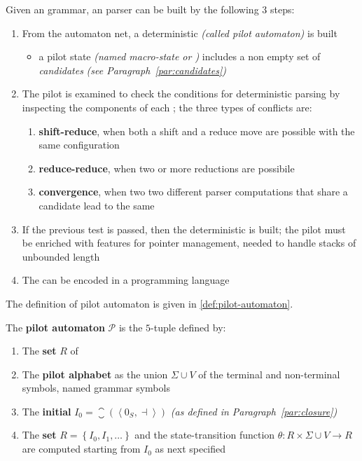 \documentclass[english]{article}
\begin{document}
Given an \EBNF grammar, an \elro parser can be built by the following \(3\) steps:

\begin{enumerate}
  \item From the automaton net, a deterministic \FSA \textit{(called pilot automaton)} is built
        \begin{itemize}
          \item a pilot state \textit{(named macro-state or \mstate)} includes a non empty set of \textit{candidates} \textit{(see Paragraph~\ref{par:candidates})}
        \end{itemize}
  \item The pilot is examined to check the conditions for deterministic parsing by inspecting the components of each \mstate; the three types of conflicts are:
        \begin{enumerate}[label=\Alph*.]
          \item \textbf{shift-reduce}, when both a shift and a reduce move are possible with the same configuration
          \item \textbf{reduce-reduce}, when two or more reductions are possibile
          \item \textbf{convergence}, when two two different parser computations that share a candidate lead to the same \mstate
        \end{enumerate}
  \item If the previous test is passed, then the deterministic \PDA is built; the pilot \FSA must be enriched with features for pointer management, needed to handle stacks of unbounded length
  \item The \PDA can be encoded in a programming language
\end{enumerate}

The definition of pilot automaton is given in \ref{def:pilot-automaton}.

\begin{definition}
  \label{def:pilot-automaton}
  The \textbf{pilot automaton} \(\mathcal{P}\) is the \(5\)-tuple defined by:

  \begin{enumerate}
    \item The \textbf{set} \(R\) of \mstates
    \item The \textbf{pilot alphabet} as the union \(\Sigma \cup V\) of the terminal and non-terminal symbols, named grammar symbols
    \item The \textbf{initial \mstate} \(I_0 = \closure\left( \left\langle 0_S, \dashv \right\rangle \right)\) \textit{(as defined in Paragraph~\ref{par:closure})}
    \item The \textbf{\mstate set} \(R = \left\{ I_0, I_1, \ldots \right\}\) and the state-transition function \(\theta: R \times \Sigma \cup V \rightarrow R\) are computed starting from \(I_0\) as next specified
  \end{enumerate}
\end{definition}
\end{document}
